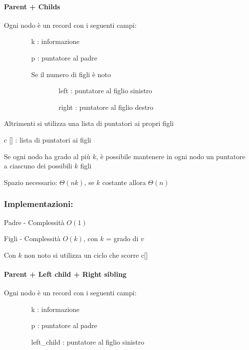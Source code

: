 \documentclass[tikz]{article}
\let\oldparagraph\paragraph
\renewcommand{\paragraph}[1]{\oldparagraph{#1}\mbox{}}
\begin{document}
{{{\paragraph{Parent + Childs}

{}

{Ogni nodo è un record con i seguenti campi:}

{~~~~~~~~k : informazione}

{~~~~~~~~p : puntatore al padre}



{~~~~~~~~Se il numero di figli è noto}

{}

{~~~~~~~~~~~~~~~~left : puntatore al figlio sinistro}

{~~~~~~~~~~~~~~~~right : puntatore al figlio destro}

{}

{Altrimenti si utilizza una lista di puntatori ai propri figli}

{c {[}{]} : lista di puntatori ai figli~~~~~~~~}

{Se ogni nodo ha grado al più $k$, è possibile mantenere in ogni nodo un puntatore a ciascuno dei possibili $k$ figli}

{Spazio necessario: $\Theta(nk)$, se $k$ costante allora $\Theta(n)$}

\subsubsection{Implementazioni:}

{Padre - Complessità $O(1)$}



{Figli - Complessità $O(k)$, con $k$ = grado di $v$ }

{Con $k$ non noto si utilizza un ciclo che scorre c{[}{]}}



\paragraph{Parent + Left child + Right sibling}

{Ogni nodo è un record con i seguenti campi:}

{~~~~~~~~k : informazione}

{~~~~~~~~p : puntatore al padre}

{~~~~~~~~left\_child : puntatore al figlio sinistro}

}}}
\end{document}

